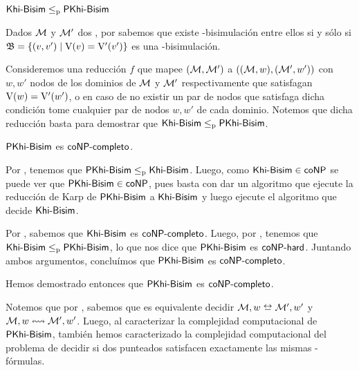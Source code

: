 \begin{lema}\label{lema:general-to-pointed}
    $\rm\textsf{Khi-Bisim} \leq_p \rm\textsf{PKhi-Bisim}$
\end{lema}

\begin{demostracion}
    Dados $\mathcal{M}$ y $\mathcal{M}'$ dos \ultss, por  sabemos que existe 
    \KHilogic-bisimulación entre ellos si y sólo si $\mathfrak{B} = \{(v,v') \mid \mathrm{V}(v) = \mathrm{V}'(v')\}$ es una \KHilogic-bisimulación.

    Consideremos una reducción $f$ que mapee $(\mathcal{M},\mathcal{M}')$ a $((\mathcal{M},w),(\mathcal{M}',w'))$ con $w,w'$ nodos de los dominios de $\mathcal{M}$ 
    y $\mathcal{M}'$ respectivamente que satisfagan $\mathrm{V}(w) = \mathrm{V}'(w')$, o en caso de no existir un par de nodos que satisfaga dicha condición tome cualquier 
    par de nodos $w,w'$ de cada dominio. Notemos que dicha reducción basta para demostrar que $\rm\textsf{Khi-Bisim} \leq_p \rm\textsf{PKhi-Bisim}$.
\end{demostracion}

\begin{teorema}
    $\rm\textsf{PKhi-Bisim}$ es $\rm\textsf{coNP-completo}$.
\end{teorema}

\begin{demostracion}
    Por , tenemos que $\rm\textsf{PKhi-Bisim} \leq_p \rm\textsf{Khi-Bisim}$. Luego, como $\rm\textsf{Khi-Bisim} \in \rm\textsf{coNP}$ se puede ver que 
    $\rm\textsf{PKhi-Bisim} \in \rm\textsf{coNP}$, pues basta con dar un algoritmo que ejecute la reducción de Karp de $\rm\textsf{PKhi-Bisim}$ a $\rm\textsf{Khi-Bisim}$ y luego ejecute 
    el algoritmo que decide $\rm\textsf{Khi-Bisim}$.


    Por , sabemos que $\rm\textsf{Khi-Bisim}$ es $\rm\textsf{coNP-completo}$. Luego, por , tenemos que 
    $\rm\textsf{Khi-Bisim} \leq_p \rm\textsf{PKhi-Bisim}$, lo que nos dice que $\rm\textsf{PKhi-Bisim}$ es $\rm\textsf{coNP-hard}$. Juntando ambos argumentos, concluímos que $\rm\textsf{PKhi-Bisim}$ es $\rm\textsf{coNP-completo}$.
\end{demostracion}


Hemos demostrado entonces que $\rm\textsf{PKhi-Bisim}$ es $\rm\textsf{coNP-completo}$.

Notemos que por , sabemos que es equivalente decidir $\modults,w \bisim \modults',w'$ y 
$\mathcal{M},w \mathrel{\leftrightsquigarrow} \mathcal{M}',w'$. Luego, al caracterizar la complejidad computacional de $\rm\textsf{PKhi-Bisim}$, también hemos caracterizado 
la complejidad computacional del problema de decidir si dos \ultss punteados satisfacen exactamente las mismas \KHilogic-fórmulas.

